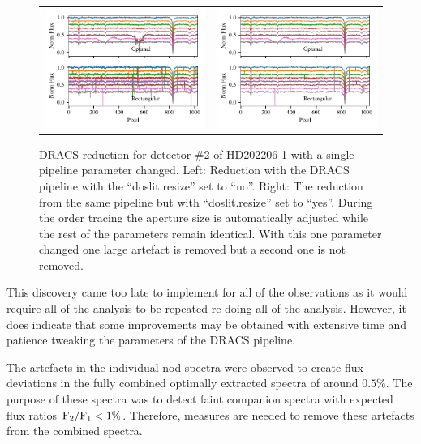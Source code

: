\begin{figure}
    \centering
    \begin{tabular}{cc}
    \includegraphics[width=0.5\linewidth]{figures/reduction/bp_plots/non_resized_nods_HD202206-1_chip_2} & \includegraphics[width=0.5\linewidth]{figures/reduction/bp_plots/resized_nods_HD202206-1_chip_2}\\
    \end{tabular}
    \caption{{DRACS} reduction for detector \#2 of HD202206-1 with a single pipeline parameter changed.
Left: Reduction with the DRACS pipeline with the ``doslit.resize'' set to ``no''.
Right: The reduction from the same pipeline but with ``doslit.resize'' set to ``yes''.
During the order tracing the aperture size is automatically adjusted while the rest of the parameters remain identical.
With this one parameter changed one large artefact is removed but a second one is not removed.}
    \label{fig:resizednods}
\end{figure}

This discovery came too late to implement for all of the observations as it would require all of the analysis to be repeated re-doing all of the analysis.
However, it does indicate that some improvements may be obtained with extensive time and patience tweaking the parameters of the {DRACS} pipeline.

The artefacts in the individual nod spectra were observed to create flux deviations in the fully combined optimally extracted spectra of around \(0.5\%\).
The purpose of these spectra was to detect faint companion spectra with expected flux ratios \(\rm {F_2}/{F_1} < 1\%\).
Therefore, measures are needed to remove these artefacts from the combined spectra.

